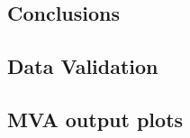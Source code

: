 \documentclass{cmspaper}
\begin{document}
     \subsection{Conclusions}
     

    \subsection{Data Validation}
    \label{app:lp_postEPSdist}
    

    \subsection{MVA output plots}
    \label{app:lp_mvaplots}
    
    
    
    
    

  \clearpage
\end{document}
